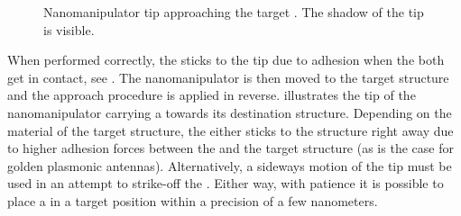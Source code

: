 	\begin{figure}[!htb]
			\centering
			\caption[Shadow of a nanomanipulator tip]{Nanomanipulator tip approaching the target \nd. The shadow of the tip is visible.}
			\label{fig::nanomanipulator_shadow}
	\end{figure}
	
	When performed correctly, the \nd sticks to the tip due to adhesion when the both get in contact, see .
	The nanomanipulator is then moved to the target structure and the approach procedure is applied in reverse.  illustrates the tip of the nanomanipulator carrying a \nd towards its destination structure.
	Depending on the material of the target structure, the \nd either sticks to the structure right away due to higher adhesion forces between the \nd and the target structure (as is the case for golden plasmonic antennas).
	Alternatively, a sideways motion of the \np tip must be used in an attempt to strike-off the \nd.
	Either way, with patience it is possible to place a \nd in a target position within a precision of a few nanometers.

